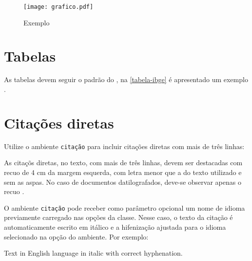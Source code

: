 \begin{figure}[!htb]
	\caption{Exemplo}\label{fig_grafico}
	\centering
	\texttt{[image: grafico.pdf]}
\end{figure}


\section{Tabelas}
As tabelas devem seguir o padrão do , na  \autoref{tabela-ibge} é apresentado um exemplo .

\begin{table}[!htb]
\end{table}



\section{Citações diretas}

Utilize o ambiente \texttt{citação} para incluir citações diretas com mais de três linhas:

\begin{citacao}
	As citaçõs diretas, no texto, com mais de três linhas, devem ser
	destacadas com recuo de 4 cm da margem esquerda, com letra menor que a do texto
	utilizado e sem as aspas. No caso de documentos datilografados, deve-se
	observar apenas o recuo \cite[5.3]{NBR10520:2002}.
\end{citacao}


O ambiente \texttt{citação} pode receber como parâmetro opcional um nome de idioma previamente carregado nas opções da classe. Nesse caso, o texto da citação é automaticamente escrito em itálico e a hifenização ajustada para o idioma selecionado na opção do ambiente. Por exemplo:
\begin{citacao}[english]
	Text in English language in italic with correct hyphenation.
\end{citacao}


